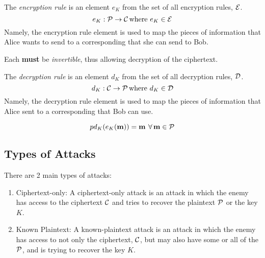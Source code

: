 \begin{definition}\label{def:Encryption_Rule}
  The \emph{encryption rule} is an element $e_{K}$ from the set of all encryption rules, $\operatorname{\mathcal{E}}$.
  \begin{equation}\label{eq:Encryption_Rule}
    e_{K} : \operatorname{\mathcal{P}} \rightarrow \operatorname{\mathcal{C}} \text{where } e_{K} \in \operatorname{\mathcal{E}}
  \end{equation}
  Namely, the encryption rule element is used to map the  pieces of information that Alice wants to send to a corresponding  that she can send to Bob.

  \begin{remark}[Invertible]\label{rmk:Encryption_Rule_Invertible}
    Each  \textbf{must} be \emph{invertible}, thus allowing decryption of the ciphertext.
  \end{remark}
\end{definition}

\begin{definition}\label{def:Decryption_Rule}
  The \emph{decryption rule} is an element $d_{K}$ from the set of all decryption rules, $\operatorname{\mathcal{D}}$.
  \begin{equation}\label{eq:Decryption_Rule}
    d_{K} : \operatorname{\mathcal{C}} \rightarrow \operatorname{\mathcal{P}} \text{where } d_{K} \in \operatorname{\mathcal{D}}
  \end{equation}
  Namely, the decryption rule element is used to map the  pieces of information that Alice sent to a corresponding  that Bob can use.

  \begin{remark}
    \begin{equation}\label{eq:Decrypt_Encryption}
p      d_{K}(e_{K}(\operatorname{\mathbf{m}})) = \operatorname{\mathbf{m}} \: \forall \operatorname{\mathbf{m}} \in \operatorname{\mathcal{P}}
    \end{equation}
  \end{remark}
\end{definition}

\subsection{Types of Attacks}\label{subsec:Attack_Types}
There are 2 main types of attacks:
\begin{enumerate}[noitemsep]
\item Ciphertext-only: A ciphertext-only attack is an attack in which the enemy has access to the ciphertext $\operatorname{\mathcal{C}}$ and tries to recover the plaintext $\operatorname{\mathcal{P}}$ or the key $K$.
\item Known Plaintext: A known-plaintext attack is an attack in which the enemy has access to not only the ciphertext, $\operatorname{\mathcal{C}}$, but may also have some or all of the $\operatorname{\mathcal{P}}$, and is trying to recover the key $K$.
\end{enumerate}


